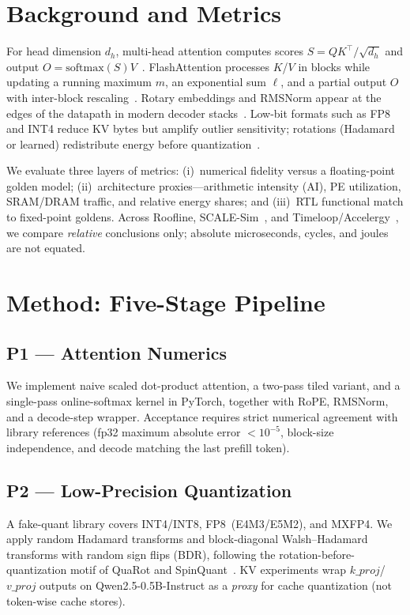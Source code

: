 \documentclass[conference]{IEEEtran}
\begin{document}
\section{Background and Metrics}
\label{sec:bg}

For head dimension $d_h$, multi-head attention computes scores $S=QK^\top/\sqrt{d_h}$ and output $O=\mathrm{softmax}(S)V$~\cite{vaswani2017attention}.
FlashAttention processes $K$/$V$ in blocks while updating a running maximum $m$, an exponential sum $\ell$, and a partial output $O$ with inter-block rescaling~\cite{dao2022flashattention}.
Rotary embeddings and RMSNorm appear at the edges of the datapath in modern decoder stacks~\cite{su2024roformer,zhang2019root}.
Low-bit formats such as FP8 and INT4 reduce KV bytes but amplify outlier sensitivity; rotations (Hadamard or learned) redistribute energy before quantization~\cite{micikevicius2022fp8,ashkboos2024quarot,liu2024spinquant}.

We evaluate three layers of metrics: (i)~numerical fidelity versus a floating-point golden model; (ii)~architecture proxies---arithmetic intensity (AI), PE utilization, SRAM/DRAM traffic, and relative energy shares; and (iii)~RTL functional match to fixed-point goldens.
Across Roofline, SCALE-Sim~\cite{scalesimv3_2025}, and Timeloop/Accelergy~\cite{parashar2019timeloop,wu2019accelergy}, we compare \emph{relative} conclusions only; absolute microseconds, cycles, and joules are not equated.

\section{Method: Five-Stage Pipeline}
\label{sec:method}

\subsection{P1 --- Attention Numerics}
We implement naive scaled dot-product attention, a two-pass tiled variant, and a single-pass online-softmax kernel in PyTorch, together with RoPE, RMSNorm, and a decode-step wrapper.
Acceptance requires strict numerical agreement with library references (fp32 maximum absolute error $<10^{-5}$, block-size independence, and decode matching the last prefill token).

\subsection{P2 --- Low-Precision Quantization}
A fake-quant library covers INT4/INT8, FP8~(E4M3/E5M2), and MXFP4.
We apply random Hadamard transforms and block-diagonal Walsh--Hadamard transforms with random sign flips (BDR), following the rotation-before-quantization motif of QuaRot and SpinQuant~\cite{ashkboos2024quarot,liu2024spinquant}.
KV experiments wrap $k\_proj$/$v\_proj$ outputs on Qwen2.5-0.5B-Instruct as a \emph{proxy} for cache quantization (not token-wise cache stores).
\end{document}
